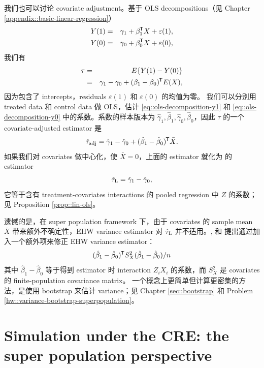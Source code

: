 我们也可以讨论 covariate adjustment。基于 OLS decompositions（见 Chapter \ref{appendix::basic-linear-regression}）
\begin{eqnarray}
Y(1) &=& \gamma_1 + \beta_1^{\mkern-1.5mu\mathsf{T}} X + \varepsilon(1),\label{eq::ols-decomposition-y1}\\
Y(0) &=& \gamma_0 + \beta_0^{\mkern-1.5mu\mathsf{T}} X + \varepsilon(0),\label{eq::ols-decomposition-y0}
\end{eqnarray}
我们有
\begin{eqnarray*}
\tau  &=& E\{  Y(1)  - Y(0)\} \\
&=& \gamma_1  -  \gamma_0 + (\beta_1 - \beta_0)^{\mkern-1.5mu\mathsf{T}} E(X),
\end{eqnarray*}
因为包含了 intercepts，residuals $  \varepsilon(1)$ 和 $\varepsilon(0)$ 的均值为零。
我们可以分别用 treated data 和 control data 做 OLS，估计 \eqref{eq::ols-decomposition-y1} 和 \eqref{eq::ols-decomposition-y0} 中的系数。系数的样本版本为 $\hat{\gamma}_1, \hat{\beta}_1, \hat{\gamma}_0, \hat{\beta}_0$，因此 $\tau $ 的一个 covariate-adjusted estimator 是
$$
\hat{\tau}_\text{adj} =  \hat \gamma_1  - \hat  \gamma_0 + (\hat \beta_1 - \hat \beta_0)^{\mkern-1.5mu\mathsf{T}} \bar{X}.
$$
如果我们对 covariates 做中心化，使 $ \bar{X} = 0$，上面的 estimator 就化为 \citet{lin2013} 的 estimator
$$
\hat{\tau}_\textsc{L} = \hat \gamma_1  - \hat  \gamma_0,
$$
它等于含有 treatment-covariates interactions 的 pooled regression 中 $Z$ 的系数；见 Proposition \ref{prop::lin-ols}。 



遗憾的是，在 super population framework 下，由于 covariates 的 sample mean $\bar{X} $ 带来额外不确定性，EHW variance estimator 对 $\hat{\tau}_\textsc{L}$ 并不适用。\citet{berk2013covariance}, \citet{negi2020revisiting} 和 \citet{zhao2020caFRT} 提出通过加入一个额外项来修正 EHW variance estimator：
\begin{equation}\label{eq::lin-ehw-correction}
(\hat \beta_1 - \hat \beta_0)^{\mkern-1.5mu\mathsf{T}} S_X^2  (\hat \beta_1 - \hat \beta_0)  / n
\end{equation}
其中 $\hat \beta_1 - \hat \beta_0$ 等于得到 \citet{lin2013} estimator 时 interaction $Z_iX_i$ 的系数，而 $S_X^2$ 是 covariates 的 finite-population covariance matrix。
一个概念上更简单但计算更密集的方法，是使用 bootstrap 来估计 variance；见 Chapter \ref{sec::bootstrap} 和 Problem \ref{hw::variance-bootstrap-superpopulation}。 



\section{Simulation under the CRE: the super population perspective}
\label{sec::simulation-CRE-superp}


